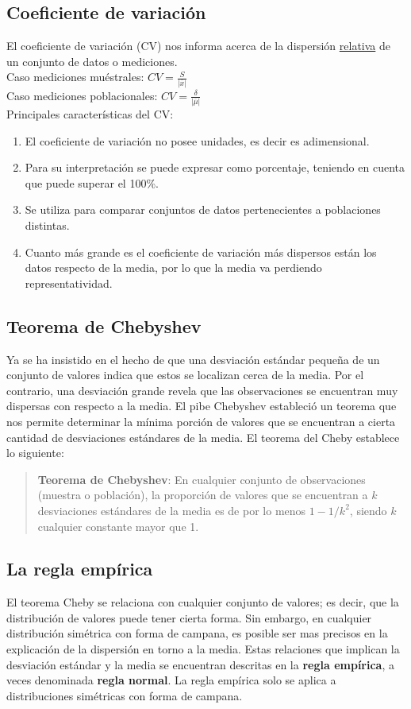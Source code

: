 \documentclass[]{article}
\begin{document}
\subsection{Coeficiente de variación}
El coeficiente de variación (CV) nos informa acerca de la dispersión \underline{relativa} de un conjunto de datos o mediciones.\\
Caso mediciones muéstrales: $CV = \frac{S}{|\overline{x}|}$\\
Caso mediciones poblacionales: $CV = \frac{\delta}{|\overline{\mu}|}$ \\
Principales características del CV:
\begin{enumerate}
	\item El coeficiente de variación no posee unidades, es decir es adimensional.
	\item Para su interpretación se puede expresar como porcentaje, teniendo en cuenta que puede superar el 100\%.
	\item Se utiliza para comparar conjuntos de datos pertenecientes a poblaciones distintas.
	\item Cuanto más grande es el coeficiente de variación más dispersos están los datos respecto de la media, por lo que la media va perdiendo representatividad.
\end{enumerate}
\subsection*{Teorema de Chebyshev}
Ya se ha insistido en el hecho de que una desviación estándar pequeña de un conjunto de valores indica que estos se localizan cerca de la media. Por el contrario, una desviación grande revela que las observaciones se encuentran muy dispersas con respecto a la media. El pibe Chebyshev estableció un teorema que nos permite determinar la mínima porción de valores que se encuentran a cierta cantidad de desviaciones estándares de la media.  El teorema del Cheby establece lo siguiente:
\begin{quote}
	\item \textbf{Teorema de Chebyshev}: En cualquier conjunto de observaciones  (muestra o población), la proporción de valores que se encuentran a $k$ desviaciones estándares de la media es de por lo menos $1 - 1/k^{2}$, siendo $k$ cualquier constante mayor que 1.
\end{quote}

\subsection*{La regla empírica}
El teorema Cheby se relaciona con cualquier conjunto de valores; es decir, que la distribución de valores puede tener cierta forma. Sin embargo, en cualquier distribución simétrica con forma de campana, es posible ser mas precisos en la explicación de la dispersión en torno a la media. Estas relaciones que implican la desviación estándar y la media se encuentran descritas en la \textbf{regla empírica}, a veces denominada \textbf{regla normal}. La regla empírica solo se aplica a distribuciones simétricas con forma de campana.
\end{document}
